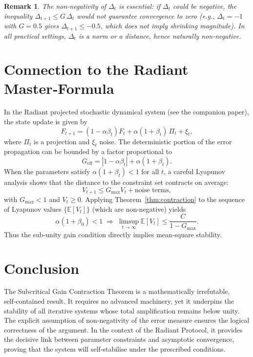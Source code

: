 \documentclass[11pt]{article}
\newtheorem{remark}[theorem]{Remark}
\begin{document}
\begin{remark}
The non‑negativity of \(\Delta_t\) is essential: if \(\Delta_t\) could be negative, the inequality \(\Delta_{t+1} \le G\,\Delta_t\) would not guarantee convergence to zero (e.g., \(\Delta_t = -1\) with \(G=0.5\) gives \(\Delta_{t+1} \le -0.5\), which does not imply shrinking magnitude). In all practical settings, \(\Delta_t\) is a norm or a distance, hence naturally non‑negative.
\end{remark}

\section{Connection to the Radiant Master‑Formula}

In the Radiant projected stochastic dynamical system (see the companion paper), the state update is given by
\[
F_{t+1} = (1 - \alpha\beta_t) F_t + \alpha(1+\beta_t)\,\Pi_t + \xi_t ,
\]
where \(\Pi_t\) is a projection and \(\xi_t\) noise. The deterministic portion of the error propagation can be bounded by a factor proportional to
\[
G_{\text{eff}} = |1 - \alpha\beta_t| + \alpha(1+\beta_t) .
\]
When the parameters satisfy \(\alpha(1+\beta_t) < 1\) for all \(t\), a careful Lyapunov analysis shows that the distance to the constraint set contracts on average:
\[
V_{t+1} \le G_{\max} V_t + \text{noise terms},
\]
with \(G_{\max} < 1\) and \(V_t \ge 0\). Applying Theorem~\ref{thm:contraction} to the sequence of Lyapunov values \(\{ \mathbb{E}[V_t] \}\) (which are non‑negative) yields
\[
\boxed{\alpha(1+\beta_0) < 1 \;\Longrightarrow\; \limsup_{t\to\infty} \mathbb{E}[V_t] \le \frac{C}{1-G_{\max}}} .
\]
Thus the sub‑unity gain condition directly implies mean‑square stability.

\section{Conclusion}
The Subcritical Gain Contraction Theorem is a mathematically irrefutable, self‑contained result. It requires no advanced machinery, yet it underpins the stability of all iterative systems whose total amplification remains below unity. The explicit assumption of non‑negativity of the error measure ensures the logical correctness of the argument. In the context of the Radiant Protocol, it provides the decisive link between parameter constraints and asymptotic convergence, proving that the system will self‑stabilise under the prescribed conditions.
\end{document}

